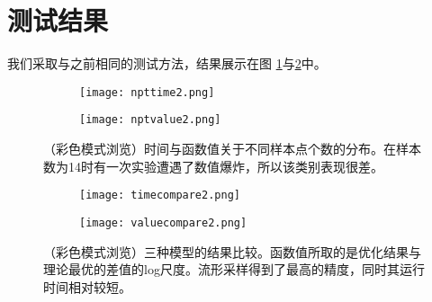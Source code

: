 \documentclass[macfonts]{njuthesis}
\begin{document}
 \section{测试结果}
 \label{ap2}
 
我们采取与之前相同的测试方法，结果展示在图 \ref{fig:npt2}与\ref{fig:compare2}中。


    \begin{figure}[ht!]
    \centering
    \begin{subfigure}{.45\textwidth}
    	\centering
        \texttt{[image: npttime2.png]}
    \end{subfigure}
    \begin{subfigure}{.45\textwidth}
    	\centering
        \texttt{[image: nptvalue2.png]}
    \end{subfigure}
    \caption{（彩色模式浏览）时间与函数值关于不同样本点个数的分布。在样本数为14时有一次实验遭遇了数值爆炸，所以该类别表现很差。}
\label{fig:npt2}
\end{figure}

  \begin{figure}[ht!]
    \centering
    \begin{subfigure}{.4\textwidth}
    	\centering
        \texttt{[image: timecompare2.png]}
    \end{subfigure}
    \begin{subfigure}{.5\textwidth}
    	\centering
        \texttt{[image: valuecompare2.png]}
    \end{subfigure}
    \caption{（彩色模式浏览）三种模型的结果比较。函数值所取的是优化结果与理论最优的差值的log尺度。流形采样得到了最高的精度，同时其运行时间相对较短。}
\label{fig:compare2}
\end{figure}
\end{document}
